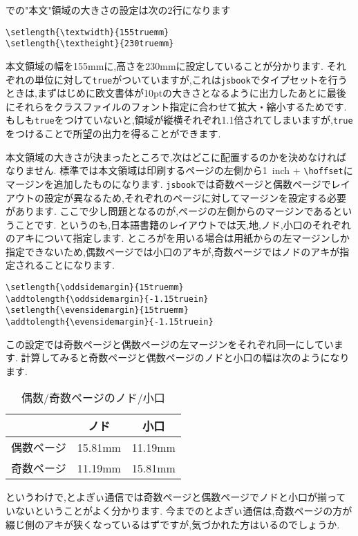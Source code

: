 での"本文"領域の大きさの設定は次の2行になります
\begin{verbatim}
\setlength{\textwidth}{155truemm}
\setlength{\textheight}{230truemm}
\end{verbatim}
本文領域の幅を155mmに,高さを230mmに設定していることが分かります.
それぞれの単位に対して\texttt{true}がついていますが,これは\texttt{jsbook}でタイプセットを行うときは,まずはじめに欧文書体が10ptの大きさとなるように出力したあとに最後にそれらをクラスファイルのフォント指定に合わせて拡大・縮小するためです.
もしも\texttt{true}をつけていないと,領域が縦横それぞれ1.1倍されてしまいますが,\texttt{true}をつけることで所望の出力を得ることができます.

本文領域の大きさが決まったところで,次はどこに配置するのかを決めなければなりません.
標準では本文領域は印刷するページの左側から1\ inch + \verb|\|\texttt{hoffset}にマージンを追加したものになります.
\texttt{jsbook}では奇数ページと偶数ページでレイアウトの設定が異なるため,それぞれのページに対してマージンを設定する必要があります.
ここで少し問題となるのが,ページの左側からのマージンであるということです.
というのも,日本語書籍のレイアウトでは天,地,ノド,小口のそれぞれのアキについて指定します.
ところが{\pLaTeX}を用いる場合は用紙からの左マージンしか指定できないため,偶数ページでは小口のアキが,奇数ページではノドのアキが指定されることになります.
\begin{verbatim}
\setlength{\oddsidemargin}{15truemm}
\addtolength{\oddsidemargin}{-1.15truein}
\setlength{\evensidemargin}{15truemm}
\addtolength{\evensidemargin}{-1.15truein}
\end{verbatim}
この設定では奇数ページと偶数ページの左マージンをそれぞれ同一にしています.
計算してみると奇数ページと偶数ページのノドと小口の幅は次のようになります.
\begin{table}[!ht]
	\centering
	\caption{偶数/奇数ページのノド/小口}
	\label{tbl:oddevenmargins}
	\begin{tabular}{c|cc} \hline \hline
		& ノド & 小口 \\ \hline
		偶数ページ & 15.81mm & 11.19mm \\
		奇数ページ & 11.19mm & 15.81mm \\ \hline
	\end{tabular}
\end{table} 
というわけで,とよぎぃ通信では奇数ページと偶数ページでノドと小口が揃っていないということがよく分かります.
今までのとよぎぃ通信は,奇数ページの方が綴じ側のアキが狭くなっているはずですが,気づかれた方はいるのでしょうか.

